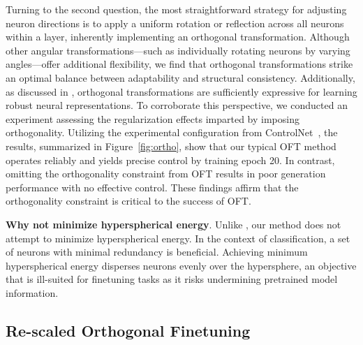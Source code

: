 Turning to the second question, the most straightforward strategy for adjusting neuron directions is to apply a uniform rotation or reflection across all neurons within a layer, inherently implementing an orthogonal transformation. Although other angular transformations—such as individually rotating neurons by varying angles—offer additional flexibility, we find that orthogonal transformations strike an optimal balance between adaptability and structural consistency. Additionally, as discussed in \cite{liu2021orthogonal}, orthogonal transformations are sufficiently expressive for learning robust neural representations. To corroborate this perspective, we conducted an experiment assessing the regularization effects imparted by imposing orthogonality. Utilizing the experimental configuration from ControlNet~\cite{zhang2023adding}, the results, summarized in Figure~\ref{fig:ortho}, show that our typical OFT method operates reliably and yields precise control by training epoch 20. In contrast, omitting the orthogonality constraint from OFT results in poor generation performance with no effective control. These findings affirm that the orthogonality constraint is critical to the success of OFT.

\textbf{Why not minimize hyperspherical energy}. Unlike \cite{liu2021orthogonal}, our method does not attempt to minimize hyperspherical energy. In the context of classification, a set of neurons with minimal redundancy is beneficial. Achieving minimum hyperspherical energy disperses neurons evenly over the hypersphere, an objective that is ill-suited for finetuning tasks as it risks undermining pretrained model information.

\subsection{Re-scaled Orthogonal Finetuning}

